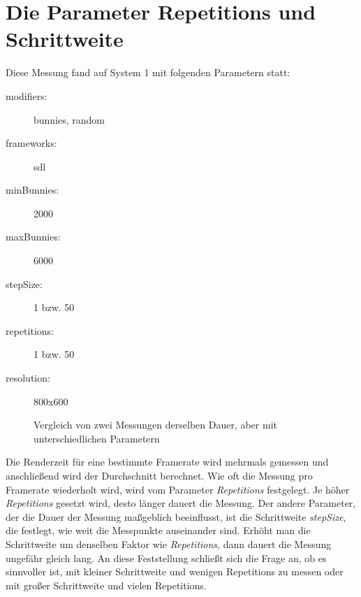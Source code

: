 \section{Die Parameter Repetitions und Schrittweite}
Diese Messung fand auf System 1 mit folgenden Parametern statt:
\begin{description}
\item[modifiers:] bunnies, random
\item[frameworks:] sdl
\item[minBunnies:] 2000
\item[maxBunnies:] 6000
\item[stepSize:] 1 bzw. 50
\item[repetitions:] 1 bzw. 50
\item[resolution:] 800x600
\end{description}
\begin{figure}[!tbp]
  \centering
  \hfill
  \caption{Vergleich von zwei Messungen derselben Dauer, aber mit unterschiedlichen Parametern}
\end{figure}
Die Renderzeit für eine bestimmte Framerate wird mehrmals gemessen und anschließend wird der Durchschnitt berechnet. Wie oft die Messung pro Framerate wiederholt wird, wird vom Parameter \textit{Repetitions} festgelegt. Je höher \textit{Repetitions} gesetzt wird, desto länger dauert die Messung. Der andere Parameter, der die Dauer der Messung maßgeblich beeinflusst, ist die Schrittweite \textit{stepSize}, die festlegt, wie weit die Messpunkte auseinander sind. Erhöht man die Schrittweite um denselben Faktor wie \textit{Repetitions}, dann dauert die Messung ungefähr gleich lang. An diese Feststellung schließt sich die Frage an, ob es sinnvoller ist, mit kleiner Schrittweite und wenigen Repetitions zu messen oder mit großer Schrittweite und vielen Repetitions.\\
